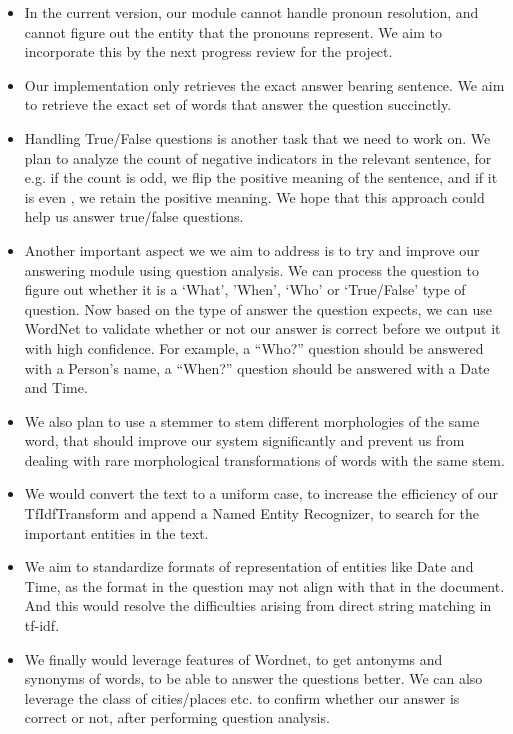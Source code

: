 \documentclass[12pt]{article}
\begin{document}
\begin{itemize}
\item In the current version, our module cannot handle pronoun resolution, and cannot figure out the entity that the pronouns represent. We aim to incorporate this by the next progress review for the project.
\item Our implementation only retrieves the exact answer bearing sentence. We aim to retrieve the exact set of words that answer the question succinctly.
\item Handling True/False questions is another task that we need to work on. We plan to analyze the count of negative indicators in the relevant sentence, for e.g. if the count is odd, we flip the positive meaning of the sentence, and if it is even , we retain the positive meaning. We hope that this approach could help us answer true/false questions.
\item Another important aspect we we aim to address is to try and improve our answering module using question analysis. We can process the question to figure out whether it is a ‘What’, ’When’, ‘Who’ or ‘True/False’ type of question. Now based on the type of answer the question expects, we can use WordNet to validate whether or not our answer is correct before we output it with high confidence. For example, a “Who?” question should be answered with a Person’s name, a “When?” question should be answered with a Date and Time.
\item We also plan to use a stemmer to stem different morphologies of the same word, that should improve our system significantly and prevent us from dealing with rare morphological transformations of words with the same stem.
\item We would convert the text to a uniform case, to increase the efficiency of our TfIdfTransform and append a Named Entity Recognizer, to search for the important entities in the text.
\item We aim to standardize formats of representation of entities like Date and Time, as the format in the question may not align with that in the document. And this would resolve the difficulties arising from direct string matching in tf-idf.
\item We finally would leverage features of Wordnet, to get antonyms and synonyms of words, to be able to answer the questions better. We can also leverage the class of cities/places etc. to confirm whether our answer is correct or not, after performing question analysis.
\end{itemize}
\end{document}
